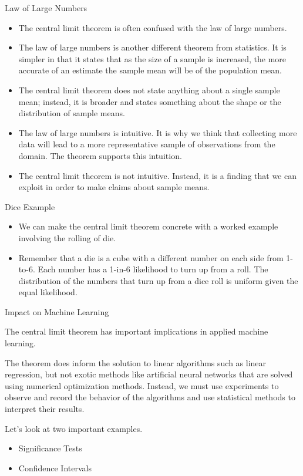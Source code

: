 \documentclass{beamer}
\begin{document}
\begin{frame}{Law of Large Numbers}
	\begin{itemize}
		\item The central limit theorem is often confused with the law of large numbers. 
		\item The law of large numbers is another different theorem from statistics. It is simpler in that it states that as the size of a sample is increased, the more accurate of an estimate the sample mean will be of the population mean.
		\item The central limit theorem does not state anything about a single sample mean; instead, it is broader and states something about the shape or the distribution of sample means.
		\item The law of large numbers is intuitive. It is why we think that collecting more data will lead to a more representative sample of observations from the domain. The theorem supports this intuition.
		\item The central limit theorem is not intuitive. Instead, it is a finding that we can exploit in order to make claims about sample means.
	\end{itemize}
\end{frame}

\begin{frame}{Dice Example}
	\begin{itemize}
		\item We can make the central limit theorem concrete with a worked example involving the rolling of die.
		\item Remember that a die is a cube with a different number on each side from 1-to-6. Each number has a 1-in-6 likelihood to turn up from a roll. The distribution of the numbers that turn up from a dice roll is uniform given the equal likelihood.
	\end{itemize}
\end{frame}

\begin{frame}{Impact on Machine Learning}
	\begin{flushleft}
			The central limit theorem has important implications in applied machine learning.
\vspace{10pt}

The theorem does inform the solution to linear algorithms such as linear regression, but not exotic methods like artificial neural networks that are solved using numerical optimization methods. Instead, we must use experiments to observe and record the behavior of the algorithms and use statistical methods to interpret their results.
\vspace{10pt}

Let’s look at two important examples.
		\begin{itemize}
			\item Significance Tests
			\item Confidence Intervals
		\end{itemize}
	\end{flushleft}
\end{frame}
\end{document}
